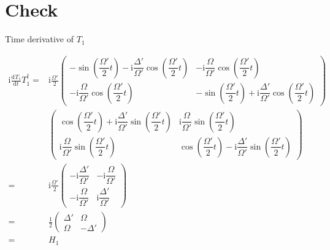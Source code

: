 \documentclass[10pt,fleqn]{article}
\newcommand{\ud}{\mathrm{d}}
\newcommand{\ui}{\mathrm{i}}
\newcommand{\eqar}[1]
{
  \begin{align*}
    #1
  \end{align*}
}
\newcommand{\paren}[1]{{\left({#1}\right)}}
\newcommand{\diff}[3][{}]{{\frac{\ud^{#1} {#2}}{\ud {#3}{}^{#1}}}}
\begin{document}
\section*{Check}
Time derivative of $T_1$
\eqar{
  \ui\diff{T_1}{t}T_1^\dagger=&\ui\frac{\Omega'}{2}\begin{pmatrix}
    -\sin\paren{\dfrac{\Omega'}{2}t}-\ui\dfrac{\Delta'}{\Omega'}\cos\paren{\dfrac{\Omega'}{2}t}&-\ui\dfrac{\Omega}{\Omega'}\cos\paren{\dfrac{\Omega'}{2}t}\\
    -\ui\dfrac{\Omega}{\Omega'}\cos\paren{\dfrac{\Omega'}{2}t}&-\sin\paren{\dfrac{\Omega'}{2}t}+\ui\dfrac{\Delta'}{\Omega'}\cos\paren{\dfrac{\Omega'}{2}t}
  \end{pmatrix}\\
  &\begin{pmatrix}
    \cos\paren{\dfrac{\Omega'}{2}t}+\ui\dfrac{\Delta'}{\Omega'}\sin\paren{\dfrac{\Omega'}{2}t}&\ui\dfrac{\Omega}{\Omega'}\sin\paren{\dfrac{\Omega'}{2}t}\\
    \ui\dfrac{\Omega}{\Omega'}\sin\paren{\dfrac{\Omega'}{2}t}&\cos\paren{\dfrac{\Omega'}{2}t}-\ui\dfrac{\Delta'}{\Omega'}\sin\paren{\dfrac{\Omega'}{2}t}
  \end{pmatrix}\\
  =&\ui\frac{\Omega'}{2}\begin{pmatrix}
    -\ui\dfrac{\Delta'}{\Omega'}&-\ui\dfrac{\Omega}{\Omega'}\\
    -\ui\dfrac{\Omega}{\Omega'}&\ui\dfrac{\Delta'}{\Omega'}
  \end{pmatrix}\\
  =&\frac{1}{2}\begin{pmatrix}
    \Delta'&\Omega\\
    \Omega&-\Delta'
  \end{pmatrix}\\
  =&H_1
}
\end{document}
